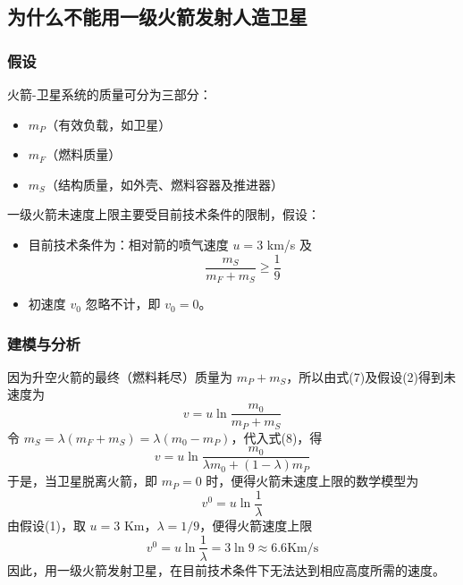 \documentclass[a4,10pt,zihao=-4]{ctexart}
\begin{document}
\subsection{为什么不能用一级火箭发射人造卫星}

\subsubsection{假设}

火箭-卫星系统的质量可分为三部分：

\begin{itemize}
    \item $m_P$（有效负载，如卫星）
    \item $m_F$（燃料质量）
    \item $m_S$（结构质量，如外壳、燃料容器及推进器）
\end{itemize}

一级火箭未速度上限主要受目前技术条件的限制，假设：

\begin{itemize}
    \item 目前技术条件为：相对箭的喷气速度 $u = 3$ km/s 及
    \begin{equation*}
        \frac{m_S}{m_F+m_S} \ge \frac{1}{9}
    \end{equation*}
    \item 初速度 $v_0$ 忽略不计，即 $v_0 = 0$。
\end{itemize}

\subsubsection{建模与分析}

因为升空火箭的最终（燃料耗尽）质量为 $m_P+m_S$，所以由式(7)及假设(2)得到未速度为
\begin{equation}
v = u\ln \frac{m_0}{m_P+m_S}
\end{equation}
令 $m_S = \lambda (m_F+m_S) = \lambda(m_0 - m_P)$，代入式(8)，得
\begin{equation}
v = u\ln\frac{m_0}{\lambda m_0 + (1-\lambda)m_P}
\end{equation}
于是，当卫星脱离火箭，即 $m_P=0$ 时，便得火箭未速度上限的数学模型为
\begin{equation*}
v^0 =u\ln \frac{1}{\lambda}
\end{equation*}
由假设(1)，取 $u=3$ Km，$\lambda = 1/9$，便得火箭速度上限
\begin{equation*}
v^0 =u\ln \frac{1}{\lambda} = 3\ln 9 \approx 6.6\text{Km/s}
\end{equation*}
因此，用一级火箭发射卫星，在目前技术条件下无法达到相应高度所需的速度。
\end{document}
